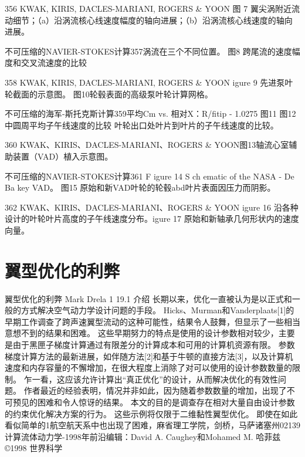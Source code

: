 \documentclass[UTF8,11pt,a4paper,openany,fontset=fandol]{ctexbook}
\begin{document}
356 KWAK, KIRIS, DACLES-MARIANI, ROGERS \& YOON 图 7 翼尖涡附近流动细节；（a）沿涡流核心线速度幅度的轴向进展；（b）沿涡流核心线速度的轴向进展。

不可压缩的NAVIER-STOKES计算357涡流在三个不同位置。 图8 跨尾流的速度幅度和交叉流速度的比较

358 KWAK, KIRIS, DACLES-MARIANI, ROGERS \& YOON igure 9 先进泵叶轮截面的示意图。 图10轮毂表面的高级泵叶轮计算网格。

不可压缩的海军-斯托克斯计算359平均Cm vs. 相对X：R/fitip - 1.0275 图11 图12中圆周平均子午线速度的比较 叶轮出口处叶片到叶片的子午线速度的比较。

360 KWAK、KIRIS、DACLES-MARIANI、ROGERS \& YOON图13轴流心室辅助装置（VAD）植入示意图。

不可压缩的NAVIER-STOKES计算361 F igure 14 S ch ematic of the NASA - De Ba key VAD。 图15 原始和新VAD叶轮的轮毂abd叶片表面因压力而阴影。

362 KWAK、KIRIS、DACLES-MARIANI、ROGERS \& YOON igure 16 沿各种设计的叶轮叶片高度的子午线速度分布。igure 17 原始和新轴承几何形状内的速度向量。

\clearpage
\chapter{翼型优化的利弊}
翼型优化的利弊 Mark Drela 1 19.1 介绍 长期以来，优化一直被认为是以正式和一般的方式解决空气动力学设计问题的手段。 Hicks、Murman和Vanderplaats[1]的早期工作调查了跨声速翼型流动的这种可能性，结果令人鼓舞，但显示了一些相当意想不到的结果和困难。 这些早期努力的特点是使用的设计参数相对较少，主要是由于黑匣子梯度计算通过有限差分的计算成本和可用的计算机资源有限。 参数梯度计算方法的最新进展，如伴随方法[2]和基于牛顿的直接方法[3]，以及计算机速度和内存容量的不懈增加，在很大程度上消除了对可以使用的设计参数数量的限制。 乍一看，这应该允许计算出“真正优化”的设计，从而解决优化的有效性问题。 作者最近的经验表明，情况并非如此，因为随着参数数量的增加，出现了不可预见的困难和令人惊讶的结果。 本文的目的是调查存在相对大量自由设计参数的约束优化解决方案的行为。 这些示例将仅限于二维黏性翼型优化。 即使在如此看似简单的1航空航天系中也出现了困难，麻省理工学院，剑桥，马萨诸塞州02139 计算流体动力学-1998年前沿编辑：David A. Caughey和Mohamed M. 哈菲兹 ©1998 世界科学
\end{document}
